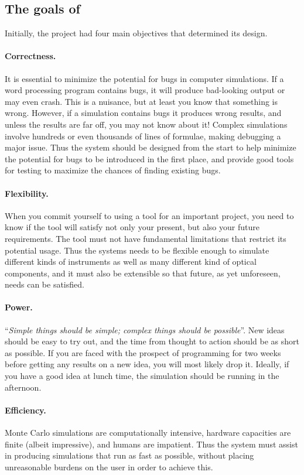 \subsection{The goals of \MCS}
\label{s:goals}

Initially, the \MCS project had four main objectives 
that determined its design.

\paragraph{Correctness.}
It is essential to minimize the potential for bugs in computer
simulations.  If a word processing program contains bugs, it will
produce bad-looking output or may even crash. This is a nuisance, but at
least you know that something is wrong. However, if a simulation
contains bugs it produces wrong results, and unless the results are far
off, you may not know about it! Complex simulations involve hundreds or
even thousands of lines of formulae, making debugging a major issue. Thus the
system should be designed from the start to help minimize the potential
for bugs to be introduced in the first place, and provide good tools for
testing to maximize the chances of finding existing bugs.
%
\paragraph{Flexibility.}
When you commit yourself to using a tool for an important project, you
need to know if the tool will satisfy not only your present, but also
your future requirements. The tool must not have fundamental limitations that
restrict its potential usage. Thus the \MCS systems needs to be
flexible enough to simulate different kinds of instruments
as well as many different kind of
optical components, and it must also be extensible so that future, as
yet unforeseen, needs can be satisfied.
%
\paragraph{Power.}
``\textit{Simple things should be simple; complex things should be possible}''.
New ideas should be easy to try out, and the time from thought to action
should be as short as possible. If you are faced with the prospect of programming for
two weeks before getting any results on a new idea, you will most likely drop
it. Ideally, if you have a good idea at lunch time, the simulation
should be running in the afternoon.
%
\paragraph{Efficiency.}
Monte Carlo simulations are computationally intensive, hardware capacities
are finite (albeit impressive), and humans are impatient. Thus the
system must assist in producing simulations that run as fast as
possible, without placing unreasonable burdens on the user in order to
achieve this.


